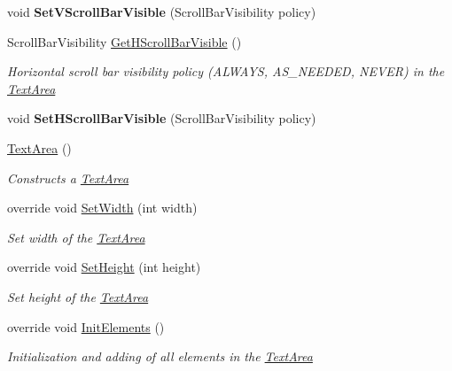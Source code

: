 \begin{DoxyCompactItemize}
\mbox{\label{class_space_v_i_l_1_1_text_area_a34a8bc3d00a4e471af20b8a201e8bc0f}} 
void {\bfseries Set\+V\+Scroll\+Bar\+Visible} (Scroll\+Bar\+Visibility policy)
\item 
Scroll\+Bar\+Visibility \mbox{\hyperlink{class_space_v_i_l_1_1_text_area_a86dde8ef01a88822f95df395742f2438}{Get\+H\+Scroll\+Bar\+Visible}} ()
\begin{DoxyCompactList}\small\item\em Horizontal scroll bar visibility policy (A\+L\+W\+A\+YS, A\+S\+\_\+\+N\+E\+E\+D\+ED, N\+E\+V\+ER) in the \mbox{\hyperlink{class_space_v_i_l_1_1_text_area}{Text\+Area}} \end{DoxyCompactList}\item 
\mbox{\label{class_space_v_i_l_1_1_text_area_aa5e2dc30608427d9ec05b6d434b2d925}} 
void {\bfseries Set\+H\+Scroll\+Bar\+Visible} (Scroll\+Bar\+Visibility policy)
\item 
\mbox{\hyperlink{class_space_v_i_l_1_1_text_area_a1450947f3404821d0242263470641c75}{Text\+Area}} ()
\begin{DoxyCompactList}\small\item\em Constructs a \mbox{\hyperlink{class_space_v_i_l_1_1_text_area}{Text\+Area}} \end{DoxyCompactList}\item 
override void \mbox{\hyperlink{class_space_v_i_l_1_1_text_area_a214e3d5afc4c12519fb8594dce699ef0}{Set\+Width}} (int width)
\begin{DoxyCompactList}\small\item\em Set width of the \mbox{\hyperlink{class_space_v_i_l_1_1_text_area}{Text\+Area}} \end{DoxyCompactList}\item 
override void \mbox{\hyperlink{class_space_v_i_l_1_1_text_area_abb58c3f9396680f5d2c7f238c0d6e0bb}{Set\+Height}} (int height)
\begin{DoxyCompactList}\small\item\em Set height of the \mbox{\hyperlink{class_space_v_i_l_1_1_text_area}{Text\+Area}} \end{DoxyCompactList}\item 
override void \mbox{\hyperlink{class_space_v_i_l_1_1_text_area_a1d7971411658c81ed831c91958df7ade}{Init\+Elements}} ()
\begin{DoxyCompactList}\small\item\em Initialization and adding of all elements in the \mbox{\hyperlink{class_space_v_i_l_1_1_text_area}{Text\+Area}} \end{DoxyCompactList}\item 

\end{DoxyCompactItemize}

